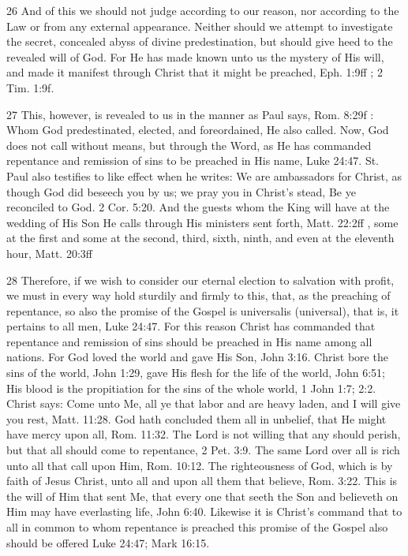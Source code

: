 {26 And of this we should not judge according to our reason, nor according to the Law or from any external appearance. Neither should we attempt to investigate the secret, concealed abyss of divine predestination, but should give heed to the revealed will of God. For He has made known unto us the mystery of His will, and made it manifest through Christ that it might be preached, Eph. 1:9ff ; 2 Tim. 1:9f.

27 This, however, is revealed to us in the manner as Paul says, Rom. 8:29f : Whom God predestinated, elected, and foreordained, He also called. Now, God does not call without means, but through the Word, as He has commanded repentance and remission of sins to be preached in His name, Luke 24:47. St. Paul also testifies to like effect when he writes: We are ambassadors for Christ, as though God did beseech you by us; we pray you in Christ’s stead, Be ye reconciled to God. 2 Cor. 5:20. And the guests whom the King will have at the wedding of His Son He calls through His ministers sent forth, Matt. 22:2ff , some at the first and some at the second, third, sixth, ninth, and even at the eleventh hour, Matt. 20:3ff

28 Therefore, if we wish to consider our eternal election to salvation with profit, we must in every way hold sturdily and firmly to this, that, as the preaching of repentance, so also the promise of the Gospel is universalis (universal), that is, it pertains to all men, Luke 24:47. For this reason Christ has commanded that repentance and remission of sins should be preached in His name among all nations. For God loved the world and gave His Son, John 3:16. Christ bore the sins of the world, John 1:29, gave His flesh for the life of the world, John 6:51; His blood is the propitiation for the sins of the whole world, 1 John 1:7; 2:2. Christ says: Come unto Me, all ye that labor and are heavy laden, and I will give you rest, Matt. 11:28. God hath concluded them all in unbelief, that He might have mercy upon all, Rom. 11:32. The Lord is not willing that any should perish, but that all should come to repentance, 2 Pet. 3:9. The same Lord over all is rich unto all that call upon Him, Rom. 10:12. The righteousness of God, which is by faith of Jesus Christ, unto all and upon all them that believe, Rom. 3:22. This is the will of Him that sent Me, that every one that seeth the Son and believeth on Him may have everlasting life, John 6:40. Likewise it is Christ’s command that to all in common to whom repentance is preached this promise of the Gospel also should be offered Luke 24:47; Mark 16:15.

}

